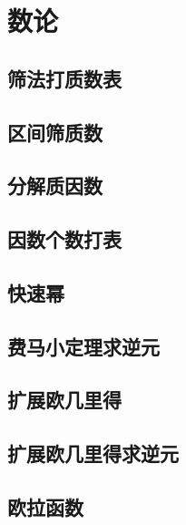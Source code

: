 \section{数论}
\subsection{筛法打质数表}


\subsection{区间筛质数}


\subsection{分解质因数}


\subsection{因数个数打表}


\subsection{快速幂}


\subsection{费马小定理求逆元}



\subsection{扩展欧几里得}


\subsection{扩展欧几里得求逆元}



\subsection{欧拉函数}


